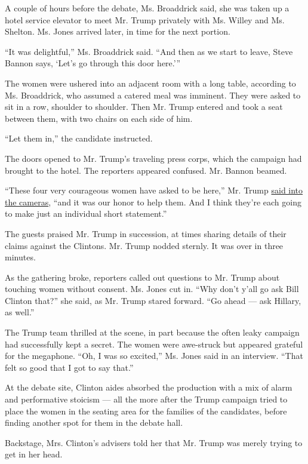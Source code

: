 A couple of hours before the debate, Ms. Broaddrick said, she was taken
up a hotel service elevator to meet Mr. Trump privately with Ms. Willey
and Ms. Shelton. Ms. Jones arrived later, in time for the next portion.

``It was delightful,'' Ms. Broaddrick said. ``And then as we start to
leave, Steve Bannon says, `Let's go through this door here.'''

The women were ushered into an adjacent room with a long table,
according to Ms. Broaddrick, who assumed a catered meal was imminent.
They were asked to sit in a row, shoulder to shoulder. Then Mr. Trump
entered and took a seat between them, with two chairs on each side of
him.

``Let them in,'' the candidate instructed.

The doors opened to Mr. Trump's traveling press corps, which the
campaign had brought to the hotel. The reporters appeared confused. Mr.
Bannon beamed.

``These four very courageous women have asked to be here,'' Mr. Trump
\href{https://www.facebook.com/DonaldTrump/videos/10157857037430725/}{said
into the cameras}, ``and it was our honor to help them. And I think
they're each going to make just an individual short statement.''

The guests praised Mr. Trump in succession, at times sharing details of
their claims against the Clintons. Mr. Trump nodded sternly. It was over
in three minutes.

As the gathering broke, reporters called out questions to Mr. Trump
about touching women without consent. Ms. Jones cut in. ``Why don't
y'all go ask Bill Clinton that?'' she said, as Mr. Trump stared forward.
``Go ahead --- ask Hillary, as well.''

The Trump team thrilled at the scene, in part because the often leaky
campaign had successfully kept a secret. The women were awe-struck but
appeared grateful for the megaphone. ``Oh, I was so excited,'' Ms. Jones
said in an interview. ``That felt so good that I got to say that.''

At the debate site, Clinton aides absorbed the production with a mix of
alarm and performative stoicism --- all the more after the Trump
campaign tried to place the women in the seating area for the families
of the candidates, before finding another spot for them in the debate
hall.

Backstage, Mrs. Clinton's advisers told her that Mr. Trump was merely
trying to get in her head.

